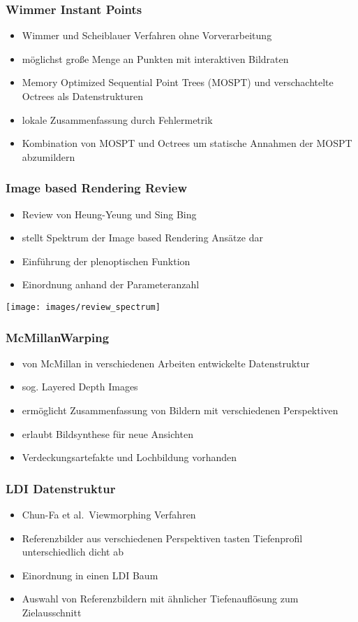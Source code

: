 \documentclass[aspectratio=169]{beamer}
\begin{document}
\begin{frame}
    \frametitle{Wimmer Instant Points}
    \begin{itemize}
        \item Wimmer und Scheiblauer Verfahren ohne Vorverarbeitung
        \item möglichst große Menge an Punkten mit interaktiven Bildraten
        \item Memory Optimized
        Sequential Point Trees (MOSPT) und verschachtelte Octrees als Datenstrukturen
        \item lokale Zusammenfassung durch Fehlermetrik
        \item Kombination von MOSPT und Octrees um statische Annahmen der MOSPT abzumildern
    \end{itemize}
\end{frame}

\begin{frame}
    \frametitle{Image based Rendering Review}
    \begin{itemize}
        \item Review von Heung-Yeung und Sing Bing
        \item stellt Spektrum der Image based Rendering Ansätze dar
        \item Einführung der plenoptischen Funktion
        \item Einordnung anhand der Parameteranzahl
    \end{itemize}
    \texttt{[image: images/review\_spectrum]}
\end{frame}

\begin{frame}
    \frametitle{McMillanWarping}
    \begin{itemize}
        \item von McMillan in verschiedenen Arbeiten entwickelte Datenstruktur
        \item sog. Layered Depth Images
        \item ermöglicht Zusammenfassung von Bildern mit verschiedenen Perspektiven
        \item erlaubt Bildsynthese für neue Ansichten
        \item Verdeckungsartefakte und Lochbildung vorhanden
    \end{itemize}
\end{frame}

\begin{frame}
    \frametitle{LDI Datenstruktur}
    \begin{itemize}
        \item Chun-Fa et al.\ Viewmorphing Verfahren
        \item Referenzbilder aus verschiedenen Perspektiven tasten Tiefenprofil unterschiedlich dicht ab
        \item Einordnung in einen LDI Baum
        \item Auswahl von Referenzbildern mit ähnlicher Tiefenauflösung zum Zielausschnitt
    \end{itemize}
\end{frame}
\end{document}
